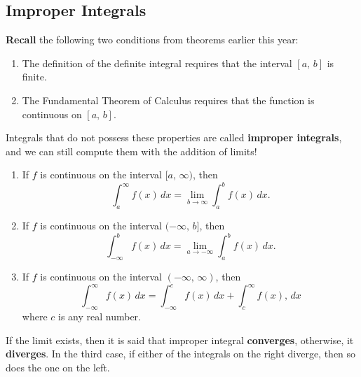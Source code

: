 \subsection*{Improper Integrals}
\textbf{Recall} the following two conditions from theorems earlier this year:
\begin{enumerate}

    \item The definition of the definite integral requires that the interval $[a,\,b]$ is finite.
    \item The Fundamental Theorem of Calculus requires that the function is continuous on $[a,\,b]$.
\end{enumerate}
Integrals that do not possess these properties are called \textbf{improper integrals}, and we can still compute them with the addition of limits!

\begin{tcolorbox}[title= DEFINITION OF IMPROPER INTEGRALS WITH INFINITE BOUNDS,colframe=black,sharp corners,colback=white,colbacktitle=white,coltitle=black]

    \begin{enumerate}
        \item If $f$ is continuous on the interval $[a,\,\infty)$, then 
        \[\int_a^\infty f(x)\,dx=\lim_{b\to\infty}\int_a^b f(x)\,dx.\]
        \item If $f$ is continuous on the interval $(-\infty,\,b]$, then 
        \[\int_{-\infty}^b f(x)\,dx=\lim_{a\to-\infty}\int_a^b f(x)\,dx.\]
        \item If $f$ is continuous on the interval $(-\infty,\,\infty)$, then 
        \[\int_{-\infty}^\infty f(x)\,dx=\int_{-\infty}^c f(x)\,dx + \int_c^{\infty} f(x),\,dx\]
        where $c$ is any real number.
    \end{enumerate}
    
    If the limit exists, then it is said that improper integral \textbf{converges}, otherwise, it \textbf{diverges}. In the third case, if either of the integrals on the right diverge, then so does the one on the left.

\end{tcolorbox}

